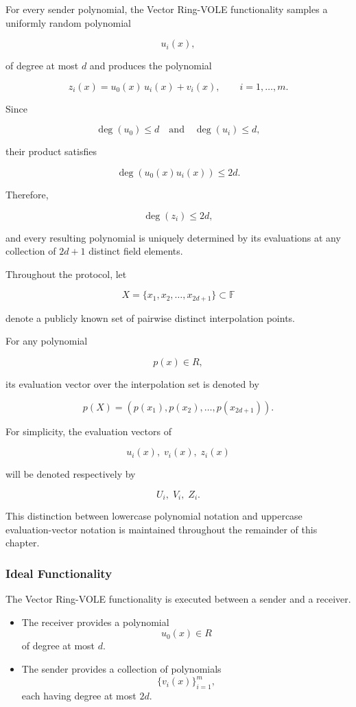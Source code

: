 \documentclass[11pt,a4paper]{article}
\begin{document}
For every sender polynomial, the Vector Ring-VOLE functionality samples a uniformly random polynomial

\[
u_i(x),
\]

of degree at most $d$ and produces the polynomial

\[
z_i(x)=u_0(x)\,u_i(x)+v_i(x),
\qquad
i=1,\ldots,m.
\]

Since

\[
\deg(u_0)\le d
\quad\text{and}\quad
\deg(u_i)\le d,
\]

their product satisfies

\[
\deg\!\left(u_0(x)u_i(x)\right)\le2d.
\]

Therefore,

\[
\deg(z_i)\le2d,
\]

and every resulting polynomial is uniquely determined by its evaluations at any collection of
$2d+1$ distinct field elements.

Throughout the protocol, let

\[
X=\{x_1,x_2,\ldots,x_{2d+1}\}\subset\mathbb{F}
\]

denote a publicly known set of pairwise distinct interpolation points.

For any polynomial

\[
p(x)\in R,
\]

its evaluation vector over the interpolation set is denoted by

\[
p(X)=
\left(
p(x_1),
p(x_2),
\ldots,
p(x_{2d+1})
\right).
\]

For simplicity, the evaluation vectors of

\[
u_i(x),\;
v_i(x),\;
z_i(x)
\]

will be denoted respectively by

\[
U_i,\;
V_i,\;
Z_i.
\]

This distinction between lowercase polynomial notation and uppercase evaluation-vector notation is
maintained throughout the remainder of this chapter.


\subsubsection{Ideal Functionality}

The Vector Ring-VOLE functionality is executed between a sender and a receiver.

\begin{itemize}
    \item The receiver provides a polynomial
    \[
    u_0(x)\in R
    \]
    of degree at most $d$.

    \item The sender provides a collection of polynomials
    \[
    \{v_i(x)\}_{i=1}^{m},
    \]
    each having degree at most $2d$.
\end{itemize}
\end{document}

